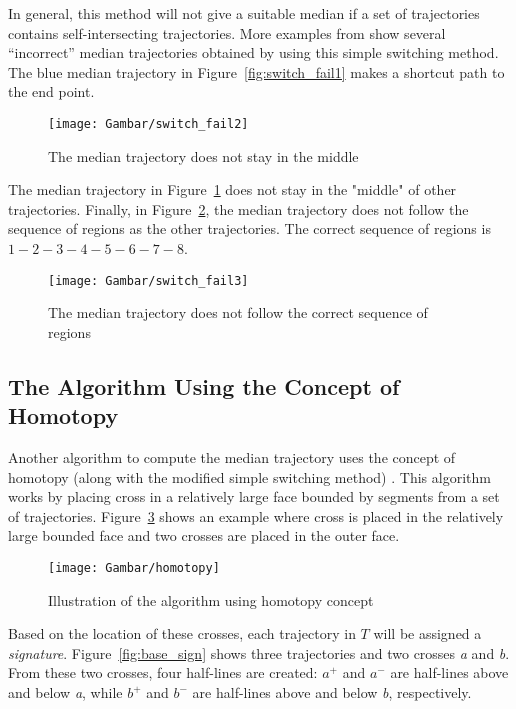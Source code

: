 In general, this method will not give a suitable median if a set of trajectories contains self-intersecting trajectories.
More examples from \cite{Lionov:2009} show several ``incorrect'' median trajectories obtained by using this simple switching method.
The blue median trajectory in Figure~\ref{fig:switch_fail1} makes a shortcut path to the end point.

\begin{figure}
\centering
\texttt{[image: Gambar/switch\_fail2]}
\caption[The median trajectory does not stay in the middle \cite{Lionov:2009}]{The median trajectory does not stay in the middle \cite{Lionov:2009}} 
\label{fig:switch_fail2}
\end{figure} 

The median trajectory in Figure~\ref{fig:switch_fail2} does not stay in the "middle" of other trajectories.
Finally, in Figure~\ref{fig:switch_fail3}, the median trajectory does not follow the sequence of regions as the other trajectories. 
The correct sequence of regions is $1-2-3-4-5-6-7-8$.

\begin{figure}
\centering
\texttt{[image: Gambar/switch\_fail3]}
\caption[The median trajectory follows incorrect direction \cite{Lionov:2009}]{The median trajectory does not follow the correct sequence of regions \cite{Lionov:2009}} 
\label{fig:switch_fail3}
\end{figure} 
 
\subsection{The Algorithm Using the Concept of Homotopy}
\label{sec:homotopy}

Another algorithm to compute the median trajectory uses the concept of homotopy (along with the modified simple switching method) \cite{Buchin:2010}.
This algorithm works by placing cross in a relatively large face bounded by segments from a set of trajectories.
Figure~\ref{fig:homotopy} shows an example where cross is placed in the relatively large bounded face and two crosses are placed in the outer face.

\begin{figure}
\centering
\texttt{[image: Gambar/homotopy]}
\caption[Illustration of the algorithm using homotopy concept]{Illustration of the algorithm using homotopy concept} 
\label{fig:homotopy}
\end{figure}

Based on the location of these crosses, each trajectory in $T$ will be assigned a \textit{signature}.
Figure~\ref{fig:base_sign} shows three trajectories and two crosses \textit{a} and \textit{b}. 
From these two crosses, four half-lines are created: \textit{$a^{+}$} and \textit{$a^{-}$} are half-lines above and below \textit{a}, while \textit{$b^{+}$} and \textit{$b^{-}$} are half-lines above and below \textit{b}, respectively. 

